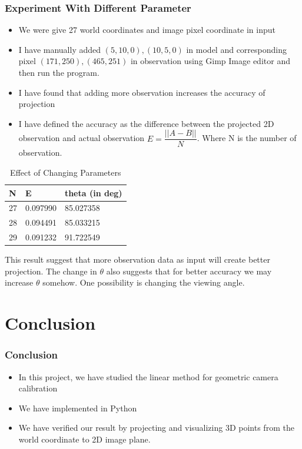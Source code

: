 \documentclass[11pt]{beamer}
\begin{document}
\begin{frame}
\frametitle{Experiment With Different Parameter}
\begin{itemize}
	\item We were give 27 world coordinates and image pixel coordinate in input
	\item I have manually added $(5,10,0),(10,5,0)$ in model and corresponding pixel $(171,250), (465,251)$  in observation using Gimp Image editor and then run the program.
	\item I have found that adding more observation increases the accuracy of projection
	\item I have defined the accuracy as the difference between the projected 2D observation and actual observation $E = \dfrac{||A - B||}{N}$. Where N is the number of observation.
\end{itemize}
\begin{table}[]
\centering
\caption{Effect of Changing Parameters}
\label{my-label}
\begin{tabular}{|l|l|l|}
\hline
N  & E                    & theta (in deg) \\ \hline
27 & 0.097990 & 85.027358  \\ \hline
28 & 0.094491 & 85.033215  \\ \hline
29 & 0.091232 & 91.722549  \\ \hline
\end{tabular}
\end{table}

This result suggest that more observation data as input will create better projection. The change in $\theta$ also suggests that for better accuracy we may increase $\theta$ somehow. One possibility is changing the viewing angle. 
\end{frame}

\section{Conclusion}
\begin{frame}
\frametitle{Conclusion}
\begin{itemize}
	\item In this project, we have studied the linear method for geometric camera calibration
	\item We have implemented in Python
	\item We have verified our result by projecting and visualizing 3D points from the world coordinate to 2D image plane.
\end{itemize}
\end{frame}
\end{document}
